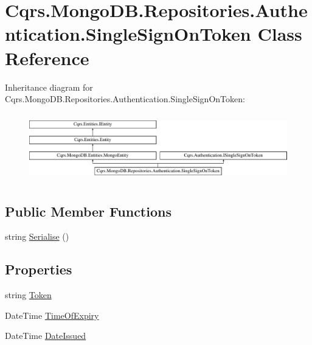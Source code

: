 \hypertarget{classCqrs_1_1MongoDB_1_1Repositories_1_1Authentication_1_1SingleSignOnToken}{}\section{Cqrs.\+Mongo\+D\+B.\+Repositories.\+Authentication.\+Single\+Sign\+On\+Token Class Reference}
\label{classCqrs_1_1MongoDB_1_1Repositories_1_1Authentication_1_1SingleSignOnToken}
Inheritance diagram for Cqrs.\+Mongo\+D\+B.\+Repositories.\+Authentication.\+Single\+Sign\+On\+Token\+:\begin{figure}[H]
\begin{center}
\leavevmode
\includegraphics[height=2.962963cm]{classCqrs_1_1MongoDB_1_1Repositories_1_1Authentication_1_1SingleSignOnToken}
\end{center}
\end{figure}
\subsection*{Public Member Functions}
\begin{DoxyCompactItemize}
\item 
string \hyperlink{classCqrs_1_1MongoDB_1_1Repositories_1_1Authentication_1_1SingleSignOnToken_a2392ecdb53f1f2a38a67d80a77f11ba4}{Serialise} ()
\end{DoxyCompactItemize}
\subsection*{Properties}
\begin{DoxyCompactItemize}
\item 
string \hyperlink{classCqrs_1_1MongoDB_1_1Repositories_1_1Authentication_1_1SingleSignOnToken_abf59456bf30dd139620ed6de3ee11e74}{Token}
\item 
Date\+Time \hyperlink{classCqrs_1_1MongoDB_1_1Repositories_1_1Authentication_1_1SingleSignOnToken_ab91868f3fc18e2369131ab931e04cacc}{Time\+Of\+Expiry}
\item 
Date\+Time \hyperlink{classCqrs_1_1MongoDB_1_1Repositories_1_1Authentication_1_1SingleSignOnToken_acf0a5524d873b709b3955374ec6cc76d}{Date\+Issued}
\end{DoxyCompactItemize}


